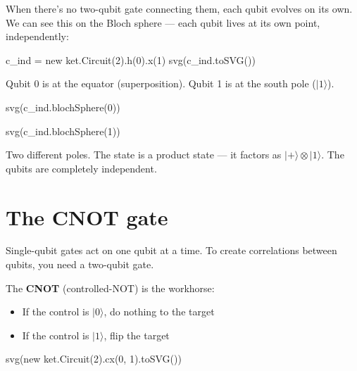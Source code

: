 \documentclass[
  11pt,
  letterpaper,
  oneside]{scrbook}
\newenvironment{Shaded}{\begin{snugshade}}{\end{snugshade}}
\newcommand{\NormalTok}[1]{\textcolor[rgb]{0.00,0.23,0.31}{#1}}
\providecommand{\tightlist}{%
  \setlength{\itemsep}{0pt}\setlength{\parskip}{0pt}}
\begin{document}
When there's no two-qubit gate connecting them, each qubit evolves on
its own. We can see this on the Bloch sphere --- each qubit lives at its
own point, independently:

\begin{Shaded}
\begin{Highlighting}[]
\NormalTok{c\_ind = new ket.Circuit(2).h(0).x(1)}
\NormalTok{svg(c\_ind.toSVG())}
\end{Highlighting}
\end{Shaded}

Qubit 0 is at the equator (superposition). Qubit 1 is at the south pole
(\(|1\rangle\)).

\begin{Shaded}
\begin{Highlighting}[]
\NormalTok{svg(c\_ind.blochSphere(0))}
\end{Highlighting}
\end{Shaded}

\begin{Shaded}
\begin{Highlighting}[]
\NormalTok{svg(c\_ind.blochSphere(1))}
\end{Highlighting}
\end{Shaded}

Two different poles. The state is a product state --- it factors as
\(|{+}\rangle \otimes |1\rangle\). The qubits are completely
independent.

\section{The CNOT gate}\label{the-cnot-gate}

Single-qubit gates act on one qubit at a time. To create correlations
between qubits, you need a two-qubit gate.

The \textbf{CNOT} (controlled-NOT) is the workhorse:

\begin{itemize}
\tightlist
\item
  If the control is \(|0\rangle\), do nothing to the target
\item
  If the control is \(|1\rangle\), flip the target
\end{itemize}

\begin{Shaded}
\begin{Highlighting}[]
\NormalTok{svg(new ket.Circuit(2).cx(0, 1).toSVG())}
\end{Highlighting}
\end{Shaded}
\end{document}
